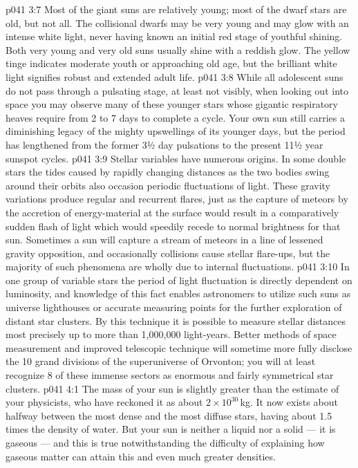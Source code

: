 \vs p041 3:7 Most of the giant suns are relatively young; most of the dwarf stars are old, but not all. The collisional dwarfs may be very young and may glow with an intense white light, never having known an initial red stage of youthful shining. Both very young and very old suns usually shine with a reddish glow. The yellow tinge indicates moderate youth or approaching old age, but the brilliant white light signifies robust and extended adult life.
\vs p041 3:8 \pc While all adolescent suns do not pass through a pulsating stage, at least not visibly, when looking out into space you may observe many of these younger stars whose gigantic respiratory heaves require from 2 to 7 days to complete a cycle. Your own sun still carries a diminishing legacy of the mighty upswellings of its younger days, but the period has lengthened from the former 3½ day pulsations to the present 11½ year sunspot cycles.
\vs p041 3:9 Stellar variables have numerous origins. In some double stars the tides caused by rapidly changing distances as the two bodies swing around their orbits also occasion periodic fluctuations of light. These gravity variations produce regular and recurrent flares, just as the capture of meteors by the accretion of energy\hyp{}material at the surface would result in a comparatively sudden flash of light which would speedily recede to normal brightness for that sun. Sometimes a sun will capture a stream of meteors in a line of lessened gravity opposition, and occasionally collisions cause stellar flare\hyp{}ups, but the majority of such phenomena are wholly due to internal fluctuations.
\vs p041 3:10 In one group of variable stars the period of light fluctuation is directly dependent on luminosity, and knowledge of this fact enables astronomers to utilize such suns as universe lighthouses or accurate measuring points for the further exploration of distant star clusters. By this technique it is possible to measure stellar distances most precisely up to more than 1,000,000 light\hyp{}years. Better methods of space measurement and improved telescopic technique will sometime more fully disclose the 10 grand divisions of the superuniverse of Orvonton; you will at least recognize 8 of these immense sectors as enormous and fairly symmetrical star clusters.
\vs p041 4:1 The mass of your sun is slightly greater than the estimate of your physicists, who have reckoned it as about $2\times 10^{30}$\,kg. It now exists about halfway between the most dense and the most diffuse stars, having about 1.5 times the density of water. But your sun is neither a liquid nor a solid --- it is gaseous --- and this is true notwithstanding the difficulty of explaining how gaseous matter can attain this and even much greater densities.
